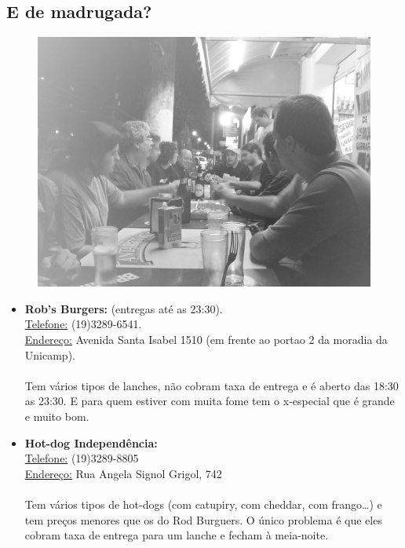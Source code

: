 \subsection{E de madrugada?}
\begin{figure}[b!]
    \centering
    \includegraphics[scale=0.72,keepaspectratio=true]{img/imgs/6-comida/-052.jpg}
\end{figure}

\begin{itemize}
\item  \textbf{Rob's Burgers:} (entregas até as 23:30).
\\\underline{Telefone:} (19)3289-6541.
\\\underline{Endereço:} Avenida Santa Isabel 1510 (em frente ao portao 2 da moradia da Unicamp).
\\\\Tem vários tipos de lanches, não cobram taxa de entrega e é aberto das 18:30 as 23:30. E para quem estiver com muita fome tem o x-especial que é grande e muito bom.
\end{itemize}

\begin{itemize}
\item  \textbf{Hot-dog Independência:}
\\\underline{Telefone:} (19)3289-8805
\\\underline{Endereço:} Rua Angela Signol Grigol, 742
\\\\Tem vários tipos de hot-dogs (com catupiry, com cheddar, com frango{\dots}) e tem preços menores que os do Rod Burguers. O único problema é que eles cobram taxa de entrega para um lanche e fecham à meia-noite.
\end{itemize}

